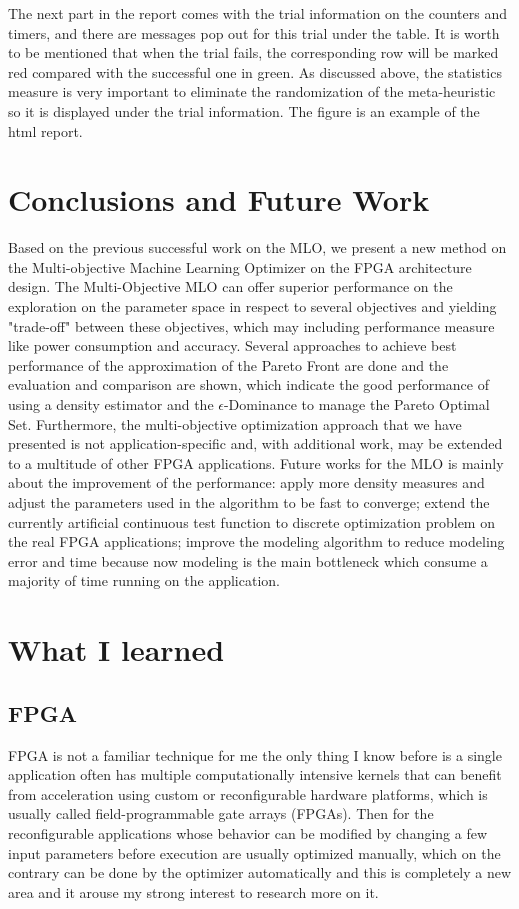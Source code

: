 \documentclass[12pt, runningheads,a4paper]{llncs}
\begin{document}
The next part in the report comes with the trial information on the counters and timers, and there are messages pop out for this trial under the table. It is worth to be mentioned that when the trial fails, the corresponding row will be marked red compared with the successful one in green. As discussed above, the statistics measure is very important to eliminate the randomization of the meta-heuristic so it is displayed under the trial information. The figure is an example of the html report.



\section{Conclusions and Future Work}
Based on the previous successful work on the MLO, we present a new method on the Multi-objective Machine Learning Optimizer on the FPGA architecture design. The Multi-Objective MLO can offer superior performance on the exploration on the parameter space in respect to several objectives and yielding "trade-off" between these objectives, which may including performance measure like power consumption and accuracy. Several approaches to achieve best performance of the approximation of the Pareto Front are done and the evaluation and comparison are shown, which indicate the good performance of using a density estimator and the $\epsilon$-Dominance to manage the Pareto Optimal Set. Furthermore, the multi-objective optimization approach that we have presented is not application-specific and, with additional work, may be extended to a multitude of other FPGA applications. Future works for the MLO is mainly about the improvement of the performance: apply more density measures and adjust the parameters used in the algorithm to be fast to converge; extend the currently artificial continuous test function to discrete optimization problem on the real FPGA applications; improve the modeling algorithm to reduce modeling error and time because now modeling is the main bottleneck which consume a majority of time running on the application. 

\section{What I learned}

\subsection{FPGA}
FPGA is not a familiar technique for me the only thing I know before is a single application often has multiple computationally intensive kernels that can benefit from acceleration using custom or reconfigurable hardware platforms, which is usually called field-programmable gate arrays (FPGAs). Then for the reconfigurable applications whose behavior can be modified by changing a few input parameters before execution are usually optimized manually, which on the contrary can be done by the optimizer automatically and this is completely a new area and it arouse my strong interest to research more on it.
 
\end{document}
